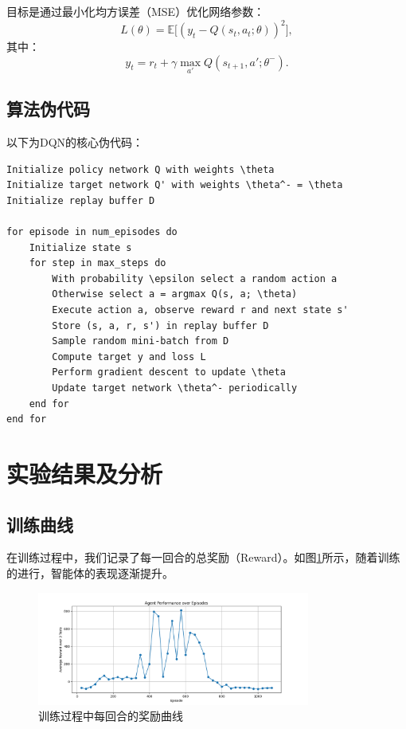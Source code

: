 \documentclass{article}
\begin{document}
目标是通过最小化均方误差（MSE）优化网络参数：
\begin{equation}
L(\theta) = \mathbb{E}\big[ (y_t - Q(s_t, a_t; \theta))^2 \big],
\end{equation}
其中：
\begin{equation}
y_t = r_t + \gamma \max_{a'} Q(s_{t+1}, a'; \theta^-).
\end{equation}

\subsection{算法伪代码}
以下为DQN的核心伪代码：
\begin{verbatim}
Initialize policy network Q with weights \theta
Initialize target network Q' with weights \theta^- = \theta
Initialize replay buffer D

for episode in num_episodes do
    Initialize state s
    for step in max_steps do
        With probability \epsilon select a random action a
        Otherwise select a = argmax Q(s, a; \theta)
        Execute action a, observe reward r and next state s'
        Store (s, a, r, s') in replay buffer D
        Sample random mini-batch from D
        Compute target y and loss L
        Perform gradient descent to update \theta
        Update target network \theta^- periodically
    end for
end for
\end{verbatim}

\section{实验结果及分析}

\subsection{训练曲线}
在训练过程中，我们记录了每一回合的总奖励（Reward）。如图\ref{fig:training_curve}所示，随着训练的进行，智能体的表现逐渐提升。

\begin{figure}[h!]
    \centering
    \includegraphics[width=0.8\textwidth]{./image/Figure_1.png}
    \caption{训练过程中每回合的奖励曲线}
    \label{fig:training_curve}
\end{figure}
\end{document}
